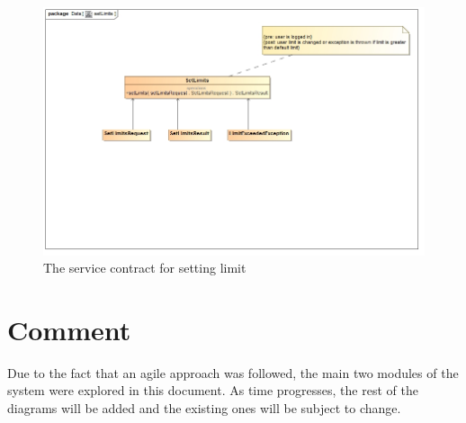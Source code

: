 \documentclass[a4paper,12pt]{article}
\begin{document}
\begin{figure}[H]
	\centering
	\includegraphics[width=1.0\textwidth]{images/setLimitsSC.jpg}
	\caption{The service contract for setting limit}
\end{figure}
 
\section{Comment}
Due to the fact that an agile approach was followed, the main two modules of the system were explored in this document. As time progresses, the rest of the diagrams will be added and the existing ones will be subject to change.
\end{document}
